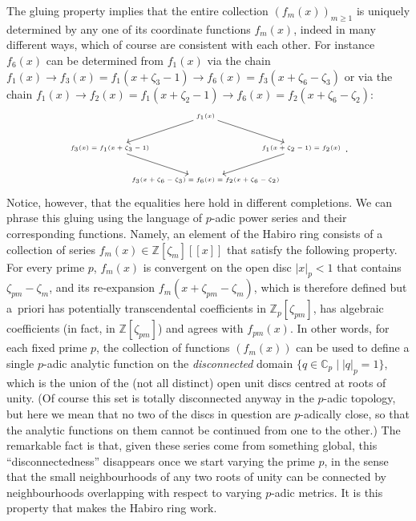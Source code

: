 \documentclass[12pt,reqno]{amsart}
\theoremstyle{definition}
\def\BZ{\mathbb Z}
\def\BC{\mathbb C}
\def\calH{\mathcal H}
\def\be{\begin{equation}}
\def\ee{\end{equation}}
\def\z{\zeta}
\begin{document}
The gluing property implies
that the entire collection $(f_m(x))_{m \geq 1}$ is uniquely determined by any one
of its coordinate functions $f_m(x)$, indeed in many different ways, which of
course are consistent with each other. For instance $f_6(x)$ can be determined from
$f_1(x)$ via the chain $f_1(x) \to f_3(x)=f_1(x+\z_3-1) \to f_6(x)=f_3(x+\z_6-\z_3)$ 
or via the chain $f_1(x) \to f_2(x)=f_1(x+\z_2-1) \to f_6(x)=f_2(x+\z_6-\z_2)$:
\be
\begin{tiny}
\begin{aligned}
\begin{tikzpicture}
\draw (0,1) node (p1) {$f_1(x)$};
\draw (-3,0) node (p2) {$f_3(x) = f_1(x+\z_3-1)$};
\draw (3,0) node (p3) {$f_1(x+\z_2-1) = f_2(x)$};
\draw (0,-1) node (p4) {$f_3(x+\z_6-\z_3) = f_6(x) = f_2(x+\z_6-\z_2)$};
\draw[->] (p1) -- (p2);
\draw[->] (p1) -- (p3);
\draw[->] (p2) -- (p4);
\draw[->] (p3) -- (p4);
\end{tikzpicture}
\end{aligned}\,.
\end{tiny}
\ee
Notice, however, that the equalities here hold in different completions.
We can phrase this gluing using the
language of
$p$-adic power series and their corresponding functions.  
Namely, an element of the Habiro ring consists of a collection of series
$f_m(x) \in \BZ[\z_m][\![x]\!]$ that satisfy the following property. For every
prime $p$, $f_m(x)$ is convergent on the open disc $|x|_p < 1$ that contains
$\z_{pm} -\z_m$, and its re-expansion $f_m(x+\z_{pm} -\z_{m})$, which is therefore
defined but a~priori has potentially transcendental coefficients in $\BZ_p[\z_{pm}]$,
has algebraic coefficients (in fact, in $\BZ[\z_{pm}]$) and agrees with $f_{pm}(x)$.
In other words, for each fixed prime $p$, the
collection of functions $(f_m(x))$ can be used to define a single $p$-adic
analytic function on the \emph{disconnected} domain 
$\{q\in\BC_p\;|\;|q|_p=1\}$, which is the union of the (not all distinct) open unit
discs centred at roots of unity.
(Of course this set is totally disconnected anyway in the $p$-adic topology,
but here we mean that no two of the discs in question are $p$-adically close, so that
the analytic functions on them cannot
be continued
from one to the other.)
The remarkable fact is that, given these series come from
something global, this ``disconnectedness'' disappears once
we start varying the prime $p$, in the sense that the small
neighbourhoods of any two roots of unity can be connected by neighbourhoods
overlapping with respect to varying $p$-adic metrics.
It is this property that makes the Habiro ring work.
\end{document}
